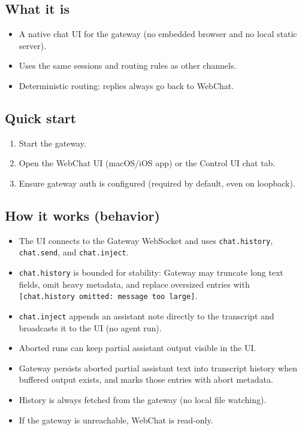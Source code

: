 \subsection{What it is}


\begin{itemize}
  \item A native chat UI for the gateway (no embedded browser and no local static server).
  \item Uses the same sessions and routing rules as other channels.
  \item Deterministic routing: replies always go back to WebChat.
\end{itemize}


\subsection{Quick start}


\begin{enumerate}
  \item Start the gateway.
  \item Open the WebChat UI (macOS/iOS app) or the Control UI chat tab.
  \item Ensure gateway auth is configured (required by default, even on loopback).
\end{enumerate}


\subsection{How it works (behavior)}


\begin{itemize}
  \item The UI connects to the Gateway WebSocket and uses \texttt{chat.history}, \texttt{chat.send}, and \texttt{chat.inject}.
  \item \texttt{chat.history} is bounded for stability: Gateway may truncate long text fields, omit heavy metadata, and replace oversized entries with \texttt{[chat.history omitted: message too large]}.
  \item \texttt{chat.inject} appends an assistant note directly to the transcript and broadcasts it to the UI (no agent run).
  \item Aborted runs can keep partial assistant output visible in the UI.
  \item Gateway persists aborted partial assistant text into transcript history when buffered output exists, and marks those entries with abort metadata.
  \item History is always fetched from the gateway (no local file watching).
  \item If the gateway is unreachable, WebChat is read-only.
\end{itemize}


